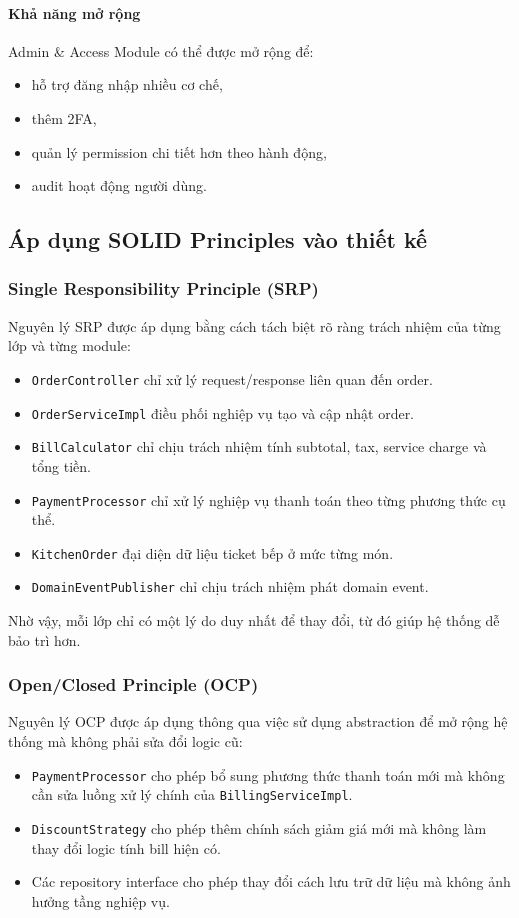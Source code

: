 \documentclass[12pt,a4paper]{article}
\begin{document}
\paragraph{Khả năng mở rộng}
Admin \& Access Module có thể được mở rộng để:
\begin{itemize}
    \item hỗ trợ đăng nhập nhiều cơ chế,
    \item thêm 2FA,
    \item quản lý permission chi tiết hơn theo hành động,
    \item audit hoạt động người dùng.
\end{itemize}

\subsection{Áp dụng SOLID Principles vào thiết kế}

\subsubsection{Single Responsibility Principle (SRP)}

Nguyên lý SRP được áp dụng bằng cách tách biệt rõ ràng trách nhiệm của từng lớp và từng module:
\begin{itemize}
    \item \texttt{OrderController} chỉ xử lý request/response liên quan đến order.
    \item \texttt{OrderServiceImpl} điều phối nghiệp vụ tạo và cập nhật order.
    \item \texttt{BillCalculator} chỉ chịu trách nhiệm tính subtotal, tax, service charge và tổng tiền.
    \item \texttt{PaymentProcessor} chỉ xử lý nghiệp vụ thanh toán theo từng phương thức cụ thể.
    \item \texttt{KitchenOrder} đại diện dữ liệu ticket bếp ở mức từng món.
    \item \texttt{DomainEventPublisher} chỉ chịu trách nhiệm phát domain event.
\end{itemize}

Nhờ vậy, mỗi lớp chỉ có một lý do duy nhất để thay đổi, từ đó giúp hệ thống dễ bảo trì hơn.

\subsubsection{Open/Closed Principle (OCP)}

Nguyên lý OCP được áp dụng thông qua việc sử dụng abstraction để mở rộng hệ thống mà không phải sửa đổi logic cũ:
\begin{itemize}
    \item \texttt{PaymentProcessor} cho phép bổ sung phương thức thanh toán mới mà không cần sửa luồng xử lý chính của \texttt{BillingServiceImpl}.
    \item \texttt{DiscountStrategy} cho phép thêm chính sách giảm giá mới mà không làm thay đổi logic tính bill hiện có.
    \item Các repository interface cho phép thay đổi cách lưu trữ dữ liệu mà không ảnh hưởng tầng nghiệp vụ.
\end{itemize}
\end{document}
